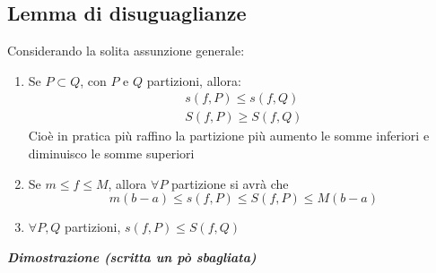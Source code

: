 \documentclass{article}
\theoremstyle{definition}
\begin{document}
\subsection{Lemma di disuguaglianze}
Considerando la solita assunzione generale:
\begin{enumerate}
    \item Se $P \subset Q$, con $P$ e $Q$ partizioni, allora:
    \begin{align*}
        s(f,P) \leqslant s(f,Q) \\
        S(f,P) \geqslant S(f,Q)
    \end{align*}
    Cioè in pratica più raffino la partizione più aumento le somme inferiori e diminuisco le somme superiori
    \item Se $m \leqslant f \leqslant M$, allora $\forall P$ partizione si avrà che 
    \begin{equation*}
        m(b-a) \leqslant s(f,P) \leqslant S(f,P) \leqslant M(b-a)
    \end{equation*}
    \item $\forall P,Q$ partizioni, $s(f,P) \leqslant S(f, Q)$
\end{enumerate}
\begin{center}
    \textbf{\textit{Dimostrazione (scritta un pò sbagliata)}}
\end{center}
\end{document}
